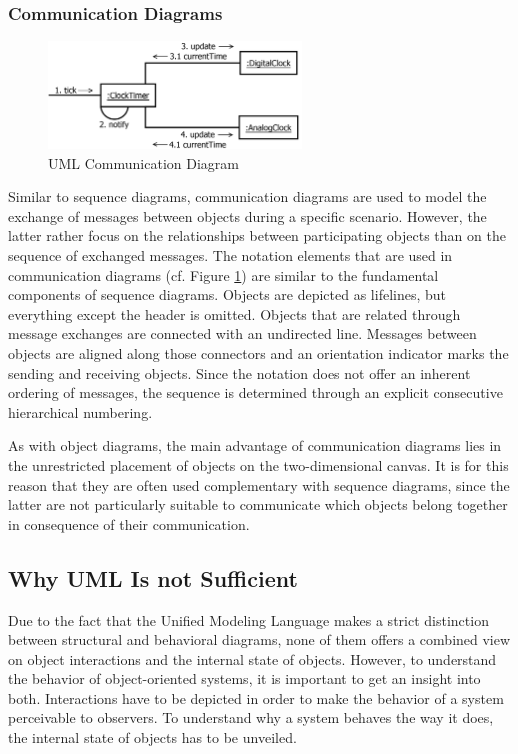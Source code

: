 \subsubsection{Communication Diagrams}

\begin{figure}
	\centering
	\includegraphics[width=0.6\textwidth]{../images/02-Communication}
	\caption{UML Communication Diagram}
	\label{fig:BackgroundModelingCommunication}
\end{figure}

Similar to sequence diagrams, communication diagrams \cite{rumbaugh_unified_2010} are used to model the exchange of messages between objects during a specific scenario.
However, the latter rather focus on the relationships between participating objects than on the sequence of exchanged messages.
The notation elements that are used in communication diagrams (cf. Figure \ref{fig:BackgroundModelingCommunication}) are similar to the fundamental components of sequence diagrams.
Objects are depicted as lifelines, but everything except the header is omitted.
Objects that are related through message exchanges are connected with an undirected line.
Messages between objects are aligned along those connectors and an orientation indicator marks the sending and receiving objects.
Since the notation does not offer an inherent ordering of messages, the sequence is determined through an explicit consecutive hierarchical numbering.

As with object diagrams, the main advantage of communication diagrams lies in the unrestricted placement of objects on the two-dimensional canvas.
It is for this reason that they are often used complementary with sequence diagrams, since the latter are not particularly suitable to communicate which objects belong together in consequence of their communication.

\subsection{Why UML Is not Sufficient}
\label{ss:BackgroundModelingChallenges}
Due to the fact that the Unified Modeling Language makes a strict distinction between structural and behavioral diagrams, none of them offers a combined view on object interactions and the internal state of objects.
However, to understand the behavior of object-oriented systems, it is important to get an insight into both.
Interactions have to be depicted in order to make the behavior of a system perceivable to observers.
To understand why a system behaves the way it does, the internal state of objects has to be unveiled.

